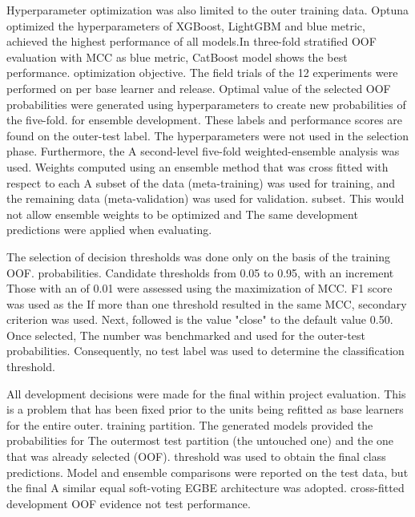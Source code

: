\documentclass[conference]{IEEEtran}
\begin{document}
Hyperparameter optimization was also limited to the outer training
data. Optuna optimized the hyperparameters of XGBoost, LightGBM and
blue metric, achieved the highest performance of all models.In three-fold stratified OOF evaluation with MCC as blue metric, CatBoost model shows the best performance.
optimization objective. The field trials of the 12 experiments were performed on
per base learner and release. Optimal value of the selected
OOF probabilities were generated using hyperparameters to create new probabilities of the five-fold.
for ensemble development. These labels and performance scores are found on the outer-test label.
The hyperparameters were not used in the selection phase. Furthermore, the
A second-level five-fold weighted-ensemble analysis was used.
Weights computed using an ensemble method that was cross fitted with respect to each
A subset of the data (meta-training) was used for training, and the remaining data (meta-validation) was used for validation.
subset. This would not allow ensemble weights to be optimized and
The same development predictions were applied when evaluating.

The selection of decision thresholds was done only on the basis of the training OOF.
probabilities. Candidate thresholds from 0.05 to 0.95, with an increment
Those with an of 0.01 were assessed using the maximization of MCC. F1 score was used as the
If more than one threshold resulted in the same MCC, secondary criterion was used.
Next, followed is the value "close" to the default value 0.50. Once selected,
The number was benchmarked and used for the outer-test probabilities.
Consequently, no test label was used to determine the classification
threshold.

All development decisions were made for the final within project evaluation.
This is a problem that has been fixed prior to the units being refitted as base learners for the entire outer.
training partition. The generated models provided the probabilities for
The outermost test partition (the untouched one) and the one that was already selected (OOF).
threshold was used to obtain the final class predictions. Model and
ensemble comparisons were reported on the test data, but the final
A similar equal soft-voting EGBE architecture was adopted.
cross-fitted development OOF evidence not test performance.
\end{document}
